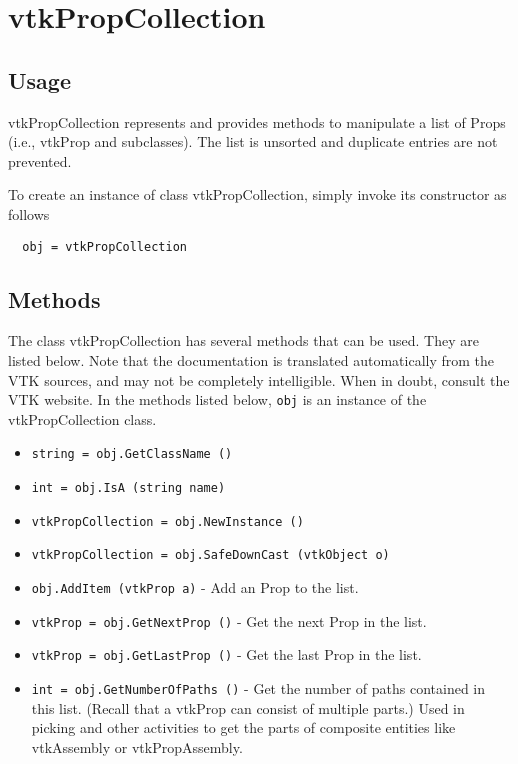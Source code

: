 \section{vtkPropCollection}

\subsection{Usage}

 vtkPropCollection represents and provides methods to manipulate a list of
 Props (i.e., vtkProp and subclasses). The list is unsorted and duplicate
 entries are not prevented.

To create an instance of class vtkPropCollection, simply
invoke its constructor as follows
\begin{verbatim}
  obj = vtkPropCollection
\end{verbatim}
\subsection{Methods}

The class vtkPropCollection has several methods that can be used.
  They are listed below.
Note that the documentation is translated automatically from the VTK sources,
and may not be completely intelligible.  When in doubt, consult the VTK website.
In the methods listed below, \verb|obj| is an instance of the vtkPropCollection class.
\begin{itemize}
\item  \verb|string = obj.GetClassName ()|

\item  \verb|int = obj.IsA (string name)|

\item  \verb|vtkPropCollection = obj.NewInstance ()|

\item  \verb|vtkPropCollection = obj.SafeDownCast (vtkObject o)|

\item  \verb|obj.AddItem (vtkProp a)| -  Add an Prop to the list.

\item  \verb|vtkProp = obj.GetNextProp ()| -  Get the next Prop in the list.

\item  \verb|vtkProp = obj.GetLastProp ()| -  Get the last Prop in the list.

\item  \verb|int = obj.GetNumberOfPaths ()| -  Get the number of paths contained in this list. (Recall that a
 vtkProp can consist of multiple parts.) Used in picking and other
 activities to get the parts of composite entities like vtkAssembly
 or vtkPropAssembly.

\end{itemize}
